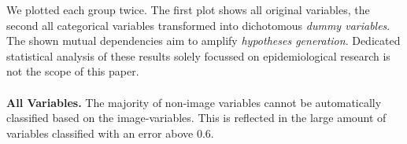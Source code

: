\documentclass[a4paper,twoside]{style/article}
\begin{document}
We plotted each group twice.
The first plot shows all original variables, the second all categorical variables transformed into dichotomous \emph{dummy variables}.
The shown mutual dependencies aim to amplify \emph{hypotheses generation}.
Dedicated statistical analysis of these results solely focussed on epidemiological research is not the scope of this paper.
\\\\
\noindent \textbf{All Variables.}
The majority of non-image variables cannot be automatically classified based on the image-variables.
This is reflected in the large amount of variables classified with an error above $0.6$.
\end{document}

